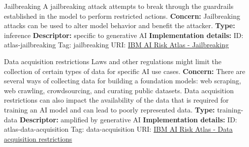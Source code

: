 \begin{definitionbox}{Jailbreaking}
A jailbreaking attack attempts to break through the guardrails established in the model to perform restricted actions.\newline\newline
\textbf{Concern: }Jailbreaking attacks can be used to alter model behavior and benefit the attacker.\newline\newline
\textbf{Type: }inference\newline
\textbf{Descriptor: }specific to generative AI \newline\newline
\textbf{Implementation details: } \newline
ID: atlas-jailbreaking \newline
Tag: jailbreaking \newline
URI:  \href{https://www.ibm.com/docs/en/watsonx/saas?topic=SSYOK8/wsj/ai-risk-atlas/jailbreaking.html}{IBM AI Risk Atlas - Jailbreaking}\newline
\end{definitionbox}
\begin{definitionbox}{Data acquisition restrictions}
Laws and other regulations might limit the collection of certain types of data for specific AI use cases.\newline\newline
\textbf{Concern: }There are several ways of collecting data for building a foundation models: web scraping, web crawling, crowdsourcing, and curating public datasets. Data acquisition restrictions can also impact the availability of the data that is required for training an AI model and can lead to poorly represented data.\newline\newline
\textbf{Type: }training-data\newline
\textbf{Descriptor: }amplified by generative AI \newline\newline
\textbf{Implementation details: } \newline
ID: atlas-data-acquisition \newline
Tag: data-acquisition \newline
URI:  \href{https://www.ibm.com/docs/en/watsonx/saas?topic=SSYOK8/wsj/ai-risk-atlas/data-acquisition.html}{IBM AI Risk Atlas - Data acquisition restrictions}\newline
\end{definitionbox}
